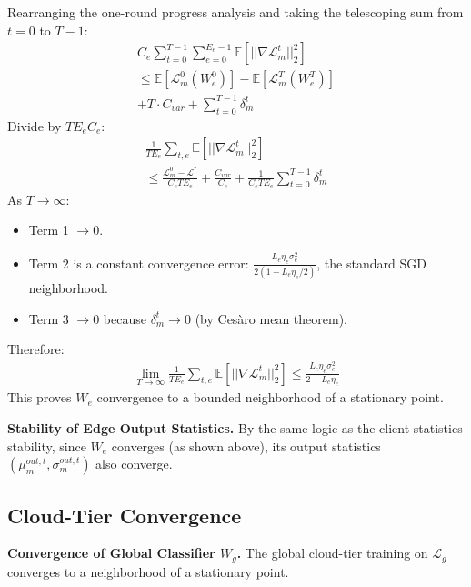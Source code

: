 Rearranging the one-round progress analysis and taking the telescoping sum from $t=0$ to $T-1$:
\begin{multline}
    C_e \sum_{t=0}^{T-1} \sum_{e=0}^{E_e-1} \mathbb{E}[||\nabla \mathcal{L}_m^t||_2^2] \\
    \le \mathbb{E}[\mathcal{L}_m^0(W_e^0)] - \mathbb{E}[\mathcal{L}_m^T(W_e^T)] \\
    + T \cdot C_{var} + \sum_{t=0}^{T-1} \delta_m^t
\end{multline}
Divide by $T E_e C_e$:
\begin{multline}
    \frac{1}{T E_e} \sum_{t,e} \mathbb{E}[||\nabla \mathcal{L}_m^t||_2^2] \\
    \le \frac{\mathcal{L}_m^0 - \mathcal{L}^*}{C_e T E_e} + \frac{C_{var}}{C_e} + \frac{1}{C_e T E_e} \sum_{t=0}^{T-1} \delta_m^t 
\end{multline}
As $T \to \infty$:
\begin{itemize}
    \item Term 1 $\to 0$.
    \item Term 2 is a constant convergence error: $\frac{L_e \eta_e \sigma_e^2}{2(1 - L_e\eta_e/2)}$, the standard SGD neighborhood.
    \item Term 3 $\to 0$ because $\delta_m^t \to 0$ (by Cesàro mean theorem).
\end{itemize}
Therefore:
\begin{multline}
    \lim_{T \to \infty} \frac{1}{T E_e} \sum_{t,e} \mathbb{E}[||\nabla \mathcal{L}_m^t||_2^2] \le \frac{L_e \eta_e \sigma_e^2}{2 - L_e \eta_e}
\end{multline}
This proves $W_e$ convergence to a bounded neighborhood of a stationary point.

\noindent\textbf{Stability of Edge Output Statistics.}
By the same logic as the client statistics stability, since $W_e$ converges (as shown above), its output statistics $(\mu_m^{out, t}, \sigma_m^{out, t})$ also converge.


\subsection*{Cloud-Tier Convergence}
\label{sec:part3}

\noindent\textbf{Convergence of Global Classifier $W_g$.}
The global cloud-tier training on $\mathcal{L}_g$ converges to a neighborhood of a stationary point.

